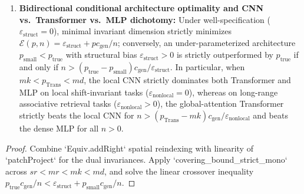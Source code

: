 \begin{lemma}
\begin{enumerate}
\item \textbf{Bidirectional conditional architecture optimality and CNN vs.\ Transformer vs.\ MLP dichotomy:} Under well-specification ($\varepsilon_{\mathrm{struct}} = 0$), minimal invariant dimension strictly minimizes $\mathcal{E}(p,n) = \varepsilon_{\mathrm{struct}} + p c_{\mathrm{gen}}/n$; conversely, an under-parameterized architecture $p_{\mathrm{small}} < p_{\mathrm{true}}$ with structural bias $\varepsilon_{\mathrm{struct}} > 0$ is strictly outperformed by $p_{\mathrm{true}}$ if and only if $n > (p_{\mathrm{true}} - p_{\mathrm{small}})c_{\mathrm{gen}}/\varepsilon_{\mathrm{struct}}$. In particular, when $mk < p_{\mathrm{Trans}} < md$, the local CNN strictly dominates both Transformer and MLP on local shift-invariant tasks ($\varepsilon_{\mathrm{nonlocal}}=0$), whereas on long-range associative retrieval tasks ($\varepsilon_{\mathrm{nonlocal}}>0$), the global-attention Transformer strictly beats the local CNN for $n > (p_{\mathrm{Trans}}-mk)c_{\mathrm{gen}}/\varepsilon_{\mathrm{nonlocal}}$ and beats the dense MLP for all $n>0$.
\end{enumerate}
\end{lemma}
\begin{proof}
\leanok
Combine `Equiv.addRight` spatial reindexing with linearity of `patchProject` for the dual invariances. Apply `covering_bound_strict_mono` across $sr < mr < mk < md$, and solve the linear crossover inequality $p_{\mathrm{true}} c_{\mathrm{gen}}/n < \varepsilon_{\mathrm{struct}} + p_{\mathrm{small}} c_{\mathrm{gen}}/n$.
\end{proof}

